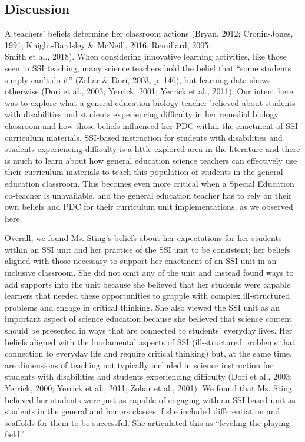 \documentclass[11.5pt]{sig-alternate}
\begin{document}
\begin{large}
\section*{Discussion}

A teachers’ beliefs determine her classroom actions (Bryan, 2012; Cronin-Jones, 1991; Knight-Bardsley \& McNeill, 2016; Remillard, 2005; \\Smith et al., 2018). When considering innovative learning activities, like those seen in SSI teaching, many science teachers hold the belief that “some students simply can’t do it” (Zohar \& Dori, 2003, p. 146), but learning data shows otherwise (Dori et al., 2003; Yerrick, 2001; Yerrick et al., 2011). Our intent here was to explore what a general education biology teacher believed about students with disabilities and students experiencing difficulty in her remedial biology classroom and how those beliefs influenced her PDC within the enactment of SSI curriculum materials. SSI-based instruction for students with disabilities and students experiencing difficulty is a little explored area in the literature and there is much to learn about how general education science teachers can effectively use their curriculum materials to teach this population of students in the general education classroom. This becomes even more critical when a Special Education co-teacher is unavailable, and the general education teacher has to rely on their own beliefs and PDC for their curriculum unit implementations, as we observed here.

Overall, we found Ms. Sting’s beliefs about her expectations for her students within an SSI unit and her practice of the SSI unit to be consistent; her beliefs aligned with those necessary to support her enactment of an SSI unit in an inclusive classroom. She did not omit any of the unit and instead found ways to add supports into the unit because she believed that her students were capable learners that needed these opportunities to grapple with complex ill-structured problems and engage in critical thinking. She also viewed the SSI unit as an important aspect of science education because she believed that science content should be presented in ways that are connected to students’ everyday lives. Her beliefs aligned with the fundamental aspects of SSI (ill-structured problems that connection to everyday life and require critical thinking) but, at the same time, are dimensions of teaching not typically included in science instruction for students with disabilities and students experiencing difficulty (Dori et al., 2003; Yerrick, 2000; Yerrick et al., 2011; Zohar et al., 2001). We found that Ms. Sting believed her students were just as capable of engaging with an SSI-based unit as students in the general and honors classes if she included differentiation and scaffolds for them to be successful. She articulated this as “leveling the playing field.”


\end{large}
\end{document}
